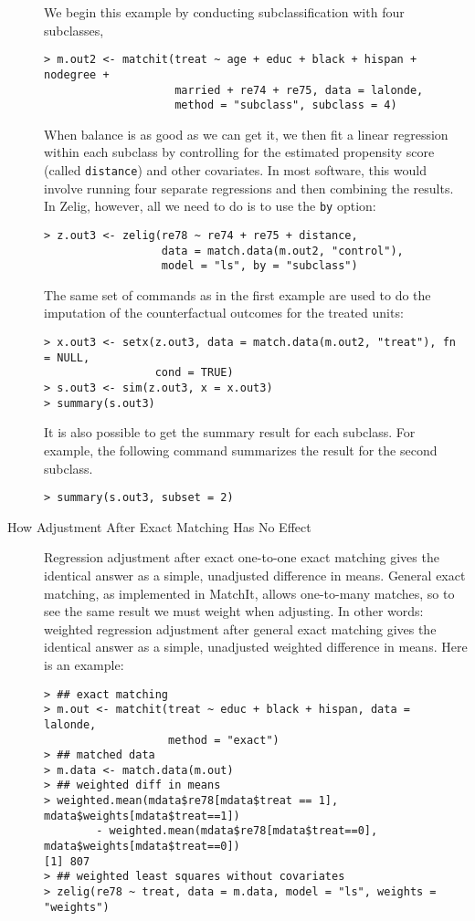 \begin{description}
  We begin this example by conducting subclassification with four
  subclasses,
\begin{verbatim}
> m.out2 <- matchit(treat ~ age + educ + black + hispan + nodegree + 
                    married + re74 + re75, data = lalonde, 
                    method = "subclass", subclass = 4)
\end{verbatim}
  When balance is as good as we can get it, we then fit a linear
  regression within each subclass by controlling for the estimated
  propensity score (called \texttt{distance}) and other covariates.
  In most software, this would involve running four separate
  regressions and then combining the results.  In Zelig, however, all
  we need to do is to use the {\tt by} option:
\begin{verbatim}
> z.out3 <- zelig(re78 ~ re74 + re75 + distance, 
                  data = match.data(m.out2, "control"), 
                  model = "ls", by = "subclass")
\end{verbatim}
  The same set of commands as in the first example are used to do the
  imputation of the counterfactual outcomes for the treated units:
\begin{verbatim}
> x.out3 <- setx(z.out3, data = match.data(m.out2, "treat"), fn = NULL, 
                 cond = TRUE)
> s.out3 <- sim(z.out3, x = x.out3)
> summary(s.out3)
\end{verbatim}
It is also possible to get the summary result for each subclass. For
example, the following command summarizes the result for the second
subclass.
\begin{verbatim}
> summary(s.out3, subset = 2)
\end{verbatim}
  
\item[How Adjustment After Exact Matching Has No Effect] Regression 
adjustment after exact one-to-one exact matching gives the identical 
answer as a simple, unadjusted difference in means.  General exact 
matching, as implemented in MatchIt, allows one-to-many matches, so to see 
the same result we must weight when adjusting.  In other words: weighted 
regression adjustment after general exact matching gives the identical 
answer as a simple, unadjusted weighted difference in means.  Here is an 
example:

\begin{verbatim}
> ## exact matching
> m.out <- matchit(treat ~ educ + black + hispan, data = lalonde, 
                   method = "exact")
> ## matched data
> m.data <- match.data(m.out)
> ## weighted diff in means
> weighted.mean(mdata$re78[mdata$treat == 1], mdata$weights[mdata$treat==1]) 
        - weighted.mean(mdata$re78[mdata$treat==0], mdata$weights[mdata$treat==0])
[1] 807
> ## weighted least squares without covariates
> zelig(re78 ~ treat, data = m.data, model = "ls", weights = "weights")


\end{verbatim}
\end{description}
